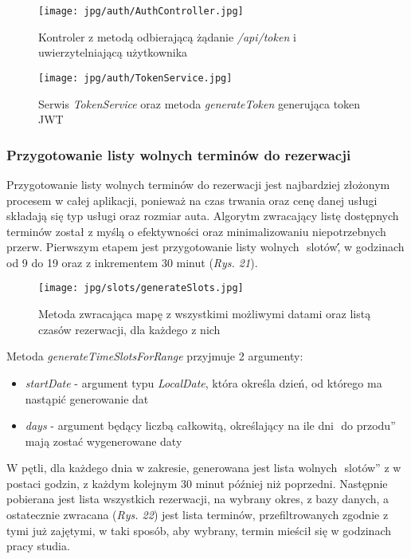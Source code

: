 \documentclass[11pt,a4paper]{article}
\begin{document}
\begin{figure}[H]
    \centering
    \texttt{[image: jpg/auth/AuthController.jpg]}
    \caption{Kontroler z metodą odbierającą żądanie \textsl{/api/token} i uwierzytelniającą użytkownika}
\end{figure}

\begin{figure}[H]
    \centering
    \texttt{[image: jpg/auth/TokenService.jpg]}
    \caption{Serwis \textsl{TokenService} oraz metoda \textsl{generateToken} generująca token JWT}
\end{figure}

\subsubsection{Przygotowanie listy wolnych terminów do rezerwacji}
Przygotowanie listy wolnych terminów do rezerwacji jest najbardziej złożonym procesem w całej aplikacji, ponieważ na czas trwania oraz cenę danej usługi składają się typ usługi oraz rozmiar auta. Algorytm zwracający listę dostępnych terminów został z myślą o efektywności oraz minimalizowaniu niepotrzebnych przerw. Pierwszym etapem jest przygotowanie listy wolnych \,\,slotów\'\', w godzinach od 9 do 19 oraz z inkrementem 30 minut (\textsl{Rys. 21}).

\begin{figure}[H]
    \centering
    \texttt{[image: jpg/slots/generateSlots.jpg]}
    \caption{Metoda zwracająca mapę z wszystkimi możliwymi datami oraz listą czasów rezerwacji, dla każdego z nich}
\end{figure}

\noindent
Metoda \textsl{generateTimeSlotsForRange} przyjmuje 2 argumenty:
\begin{itemize}
    \item \textsl{startDate} - argument typu \textsl{LocalDate}, która określa dzień, od którego ma nastąpić generowanie dat
    \item \textsl{days} - argument będący liczbą całkowitą, określający na ile dni \,\,do przodu'' mają zostać wygenerowane daty 
\end{itemize}

\noindent
W pętli, dla każdego dnia w zakresie, generowana jest lista wolnych \,\,slotów'' z w postaci godzin, z każdym kolejnym 30 minut później niż poprzedni. Następnie pobierana jest lista wszystkich rezerwacji, na wybrany okres, z bazy danych, a ostatecznie zwracana (\textsl{Rys. 22}) jest lista terminów, przefiltrowanych zgodnie z tymi już zajętymi, w taki sposób, aby wybrany, termin mieścił się w godzinach pracy studia.
\end{document}
